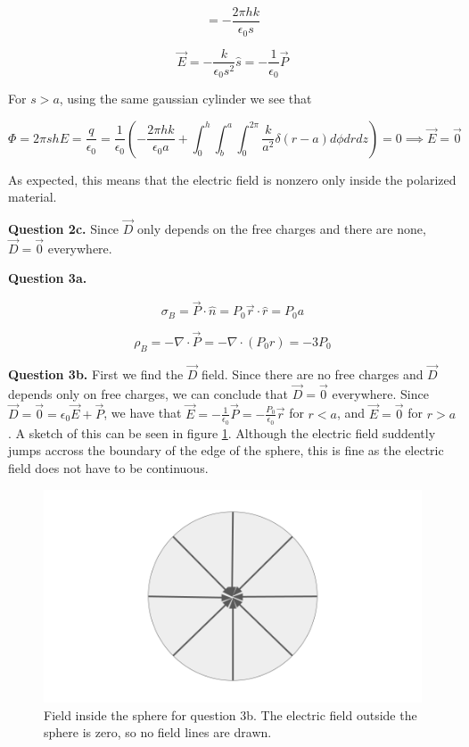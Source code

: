\documentclass[letterpaper, reqno,11pt]{article}
\begin{document}
\[
    =-\frac{2\pi hk}{\epsilon_0s}
\]

\[
    \vec E=-\frac{k}{\epsilon_0 s^2}\hat s=-\frac1{\epsilon_0}\vec P
\]

For $s>a$, using the same gaussian cylinder we see that 

\[
    \Phi=2\pi sh E=\frac{q}{\epsilon_0}=\frac1{\epsilon_0}(-\frac{2\pi hk}{\epsilon_0a}+\int_0^h\int_b^a\int_0^{2\pi} \frac{k}{a^2}\delta(r-a)d\phi drdz)=0\implies \vec E=\vec 0
\]

As expected, this means that the electric field is nonzero only inside the polarized material. 

{\noindent\bf Question 2c.} Since $\vec D$ only depends on the free charges and there are none, $\vec D=\vec 0$ everywhere. 

{\noindent\bf Question 3a.} 

\[
    \sigma_B=\vec P\cdot \hat n=P_0\vec r\cdot \hat r=P_0a
\]

\[
    \rho_B=-\nabla \cdot \vec P=-\nabla \cdot (P_0 r)=-3P_0
\]

{\noindent\bf Question 3b.} First we find the $\vec D$ field. Since there are no free charges and $\vec D$ depends only on free charges, we can conclude that $\vec D=\vec 0$ everywhere. Since $\vec D=\vec 0=\epsilon_0\vec E+\vec P$, we have that $\vec E=-\frac1{\epsilon_0}\vec P=-\frac{P_0 }{\epsilon_0}\vec r$ for $r<a$, and $\vec E=\vec 0$ for $r>a$. A sketch of this can be seen in figure \ref{fig:3b}. Although the electric field suddently jumps accross the boundary of the edge of the sphere, this is fine as the electric field does not have to be continuous. 

\begin{figure}[htbp]
\centering
\includegraphics[width=\textwidth]{3b}
\caption{Field inside the sphere for question 3b. The electric field outside the sphere is zero, so no field lines are drawn. }
\label{fig:3b}
\end{figure}
\end{document}
